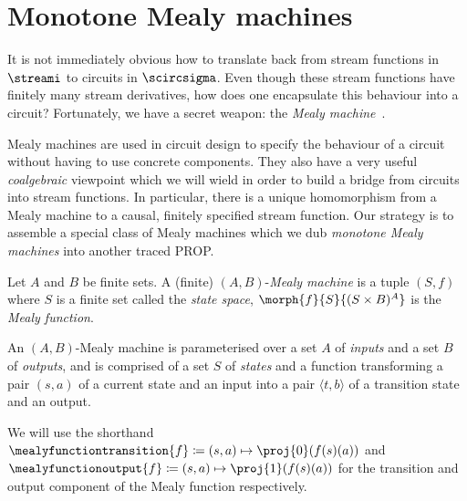 \section{Monotone Mealy machines}\label{sec:mealy}

It is not immediately obvious how to translate back from stream functions in
\(\streami\) to circuits in \(\scircsigma\).
Even though these stream functions have finitely many stream derivatives, how
does one encapsulate this behaviour into a circuit?
Fortunately, we have a secret weapon: the
\emph{Mealy machine}~\cite{mealy1955method}.

Mealy machines are used in circuit design to specify the behaviour of a circuit
without having to use concrete components.  They also have
a very useful \emph{coalgebraic} viewpoint which we will wield in order to
build a bridge from circuits into stream functions.
In particular, there is a unique homomorphism from a Mealy machine to a causal,
finitely specified stream function.
Our strategy is to assemble a special class of Mealy machines which we dub
\emph{monotone Mealy machines} into another traced PROP.

\begin{definition}\label{def:mealy}
    Let \(A\) and \(B\) be finite sets.
    A (finite) \((A,B)\)-\emph{Mealy machine} is a tuple \((S, f)\) where
    \(S\) is a finite set called the \emph{state space},
    \(\morph{f}{S}{(S \times B)^A}\) is the \emph{Mealy function}.
\end{definition}

An \((A,B)\)-Mealy machine is parameterised over a set \(A\) of \emph{inputs}
and a set \(B\) of \emph{outputs}, and is comprised of a set \(S\) of
\emph{states} and a function transforming a pair \((s, a)\) of a current state
and an input into a pair \(\langle{t,b}\rangle\) of a transition state and an
output.

\begin{notation}
    We will use the shorthand \(
    \mealyfunctiontransition{f} \coloneqq (s, a) \mapsto \proj{0}(f(s)(a))
    \) and \(
    \mealyfunctionoutput{f} \coloneqq (s, a) \mapsto \proj{1}(f(s)(a))
    \) for the transition and output component of the Mealy function respectively.
\end{notation}

